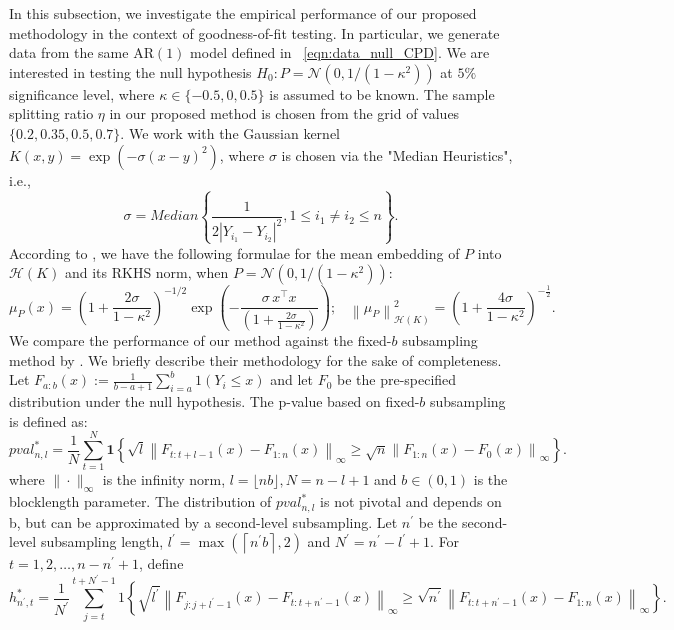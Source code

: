 \documentclass[11pt]{article}
\newcommand{\cN}{\mathcal{N}}
\theoremstyle{plain}
\theoremstyle{definition}
\theoremstyle{remark}
\begin{document}
In this subsection, we investigate the empirical performance of our proposed methodology in the context of goodness-of-fit testing. In particular, we generate data from the same AR$(1)$ model defined in ~\eqref{eqn:data_null_CPD}. We are interested in testing the null hypothesis $H_0:P=\cN(0,1/(1-\kappa^2))$ at $5\%$ significance level, where $\kappa\in \{-0.5, 0, 0.5\}$ is assumed to be known. The sample splitting ratio $\eta$ in our proposed method is chosen from the grid of values $\{0.2, 0.35, 0.5,  0.7\}.$ We work with the Gaussian kernel $K(x,y)=\exp{(-\sigma(x-y)^2)}$, where $\sigma$ is chosen via the "Median Heuristics", i.e.,
\[\sigma=Median\left\{\frac{1}{2|Y_{i_1}-Y_{i_2}|^2}, 1\leq i_1\neq i_2 \leq n\right\}.\]
According to \cite{kellner2019one}, we have the following formulae for the mean embedding of $P$ into $\mathcal{H}(K)$ and its RKHS norm, when $P=\cN(0,1/(1-\kappa^2))$:
$$\mu_P(x)=\left(1+\frac{2\sigma}{1-\kappa^2}\right)^{-1/2}\exp{\left(-\frac{\sigma\,x^{\top}x}{ \left(1+\frac{2\sigma}{1-\kappa^2}\right)}\right)};\;\;\;\left\|\mu_{P}\right\|_{\mathcal{H}(K)}^2=\left(1+\frac{4\sigma}{1-\kappa^2}\right)^{-\frac{1}{2}}.$$ 
We compare the performance of our method against the fixed-$b$ subsampling method by \cite{shao2013fixed}. We briefly describe their methodology for the sake of completeness.  
 Let $F_{a:b}(x):=\frac{1}{b-a+1}\sum_{i=a}^{b} 1(Y_i\leq x)$ and let $F_0$ be the pre-specified distribution under the null hypothesis. The p-value based on fixed-$b$ subsampling is defined as:
$$
pval_{n, l}^*=\frac{1}{N} \sum_{t=1}^N \mathbf{1}\left\{\sqrt{l}\left\|F_{t: t+l-1}(x)-F_{1: n}(x)\right\|_{\infty} \geq \sqrt{n}\left\|F_{1: n}(x)-F_0\left(x \right)\right\|_{\infty}\right\}.
$$
where $\|\cdot\|_{\infty}$ is the infinity norm, $l=\lfloor n b\rfloor, N=n-l+1$ and $b \in(0,1)$ is the blocklength
parameter. The distribution of $pval_{n, l}^*$ is not pivotal and depends on b, but can be approximated by a second-level subsampling. Let $n^{\prime}$ be the second-level subsampling length, $l^{\prime}=\max \left(\left\lceil n^{\prime} b\right\rceil, 2\right)$ and $N^{\prime}=n^{\prime}-l^{\prime}+1$. For $t=1,2, \ldots, n-n^{\prime}+1$, define
$$
h_{n^{\prime}, t}^*=\frac{1}{N^{\prime}} \sum_{j=t}^{t+N^{\prime}-1} 1\left\{\sqrt{l^{\prime}}\left\|F_{j: j+l^{\prime}-1}(x)-F_{t: t+n^{\prime}-1}(x)\right\|_{\infty} \geq \sqrt{n^{\prime}}\left\|F_{t: t+n^{\prime}-1}(x)-F_{1:n}\left(x\right)\right\|_{\infty}\right\}.
$$
\end{document}

